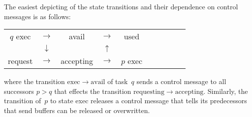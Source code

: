 The easiest depicting of the state transitions and their dependence on
control messages is as follows:

\begin{tabular}{cccccccccc}
  $q$ exec& $\longrightarrow$ & avail     & $\longrightarrow$ & used \\
          & $\downarrow$      &           & $\uparrow$ \\
  request & $\longrightarrow$ & accepting & $\longrightarrow$ & $p$ exec\\
\end{tabular}

where the transition $\mathrm{exec}\rightarrow\mathrm{avail}$ of task~$q$
sends a control message to all successors $p>q$ that effects
the transition $\mathrm{requesting}\rightarrow\mathrm{accepting}$.
Similarly, the transition of~$p$ to state exec releases a control message
that tells its predecessors that send buffers can be released or overwritten.


